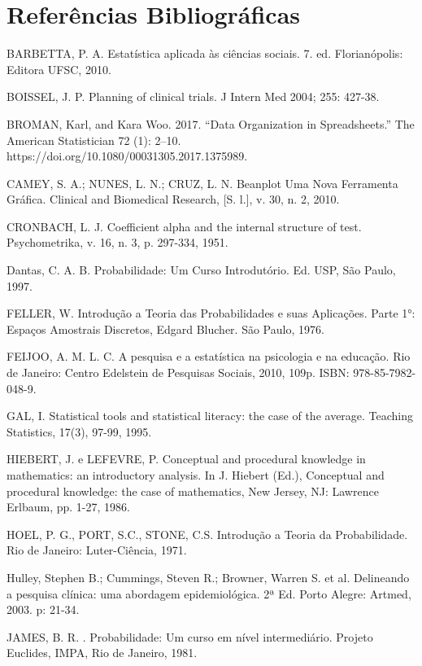 \chapter{Referências Bibliográficas}

BARBETTA, P. A. Estatística aplicada às ciências sociais. 7. ed. Florianópolis: Editora UFSC, 2010.\vskip0.3cm

BOISSEL, J. P. Planning of clinical trials. J Intern Med 2004; 255: 427-38.\vskip0.3cm

BROMAN, Karl, and Kara Woo. 2017. “Data Organization in Spreadsheets.” The American Statistician 72 (1): 2–10. https://doi.org/10.1080/00031305.2017.1375989.\vskip0.3cm

CAMEY, S. A.; NUNES, L. N.; CRUZ, L. N. Beanplot Uma Nova Ferramenta Gráfica. Clinical and Biomedical Research, [S. l.], v. 30, n. 2, 2010.\vskip0.3cm


CRONBACH, L. J. Coefficient alpha and the internal structure of test. Psychometrika, v. 16, n. 3, p. 297-334, 1951.\vskip0.3cm

Dantas, C. A. B. Probabilidade: Um Curso Introdutório. Ed.
USP, São Paulo, 1997.

FELLER, W. Introdução a Teoria das Probabilidades e suas
Aplicações. Parte 1°: Espaços Amostrais Discretos, Edgard Blucher. São Paulo, 1976.\vskip0.3cm

FEIJOO, A. M. L. C. A pesquisa e a estatística na psicologia e na educação. Rio de Janeiro:
Centro Edelstein de Pesquisas Sociais, 2010, 109p. ISBN: 978-85-7982-048-9.\vskip0.3cm

GAL, I. Statistical tools and statistical literacy: the case of the average. Teaching
Statistics, 17(3), 97-99, 1995.\vskip0.3cm

HIEBERT, J. e LEFEVRE, P. Conceptual and procedural knowledge in mathematics: an
introductory analysis. In J. Hiebert (Ed.), Conceptual and procedural knowledge: the
case of mathematics, New Jersey, NJ: Lawrence Erlbaum, pp. 1-27, 1986.\vskip0.3cm

HOEL, P. G., PORT, S.C., STONE, C.S. Introdução a Teoria da Probabilidade. Rio de
Janeiro: Luter-Ciência, 1971.\vskip0.3cm

Hulley, Stephen B.; Cummings, Steven R.; Browner, Warren S. et al. Delineando a pesquisa clínica: uma abordagem epidemiológica. 2ª Ed. Porto Alegre: Artmed, 2003. p: 21-34.\vskip0.3cm

JAMES, B. R. . Probabilidade: Um curso em nível intermediário.
Projeto Euclides, IMPA, Rio de Janeiro, 1981. \vskip0.3cm


